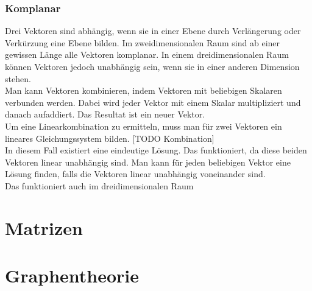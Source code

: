\documentclass{article}
\begin{document}
	\subsubsection{Komplanar}
	Drei Vektoren sind abhängig, wenn sie in einer Ebene durch Verlängerung oder Verkürzung eine Ebene bilden. Im zweidimensionalen Raum sind ab einer gewissen Länge alle Vektoren komplanar. In einem dreidimensionalen Raum können Vektoren jedoch unabhängig sein, wenn sie in einer anderen Dimension stehen. \\
	Man kann Vektoren kombinieren, indem Vektoren mit beliebigen Skalaren verbunden werden. Dabei wird jeder Vektor mit einem Skalar multipliziert und danach aufaddiert. Das Resultat ist ein neuer Vektor. \\
	Um eine Linearkombination zu ermitteln, muss man für zwei Vektoren ein lineares Gleichungssystem bilden. [TODO Kombination] \\
	In diesem Fall existiert eine eindeutige Lösung. Das funktioniert, da diese beiden Vektoren linear unabhängig sind. Man kann für jeden beliebigen Vektor eine Lösung finden, falls die Vektoren linear unabhängig voneinander sind. \\
	Das funktioniert auch im dreidimensionalen Raum
	
































	\section{Matrizen}
	\section{Graphentheorie}

	























  
\end{document}
